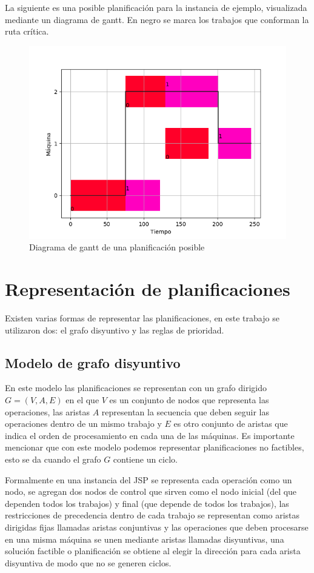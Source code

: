 La siguiente es una posible planificación para la instancia de ejemplo, visualizada mediante un diagrama de gantt. En negro se marca los trabajos que conforman la ruta crítica. 
\begin{figure}[H]
\centering
\includegraphics[scale=.7]{Imagenes/planejemplorc.png}
\caption{Diagrama de gantt de una planificación posible}
\label{fig:gantt}
\end{figure}


\section{Representación de planificaciones}
Existen varias formas de representar las planificaciones, en este trabajo se utilizaron dos: el grafo disyuntivo y las reglas de prioridad.
\subsection*{Modelo de grafo disyuntivo} 
En este modelo las planificaciones se representan con un grafo dirigido $G=(V,A,E)$ en el que $V$ es un conjunto de nodos que representa las operaciones, las aristas $A$ representan la secuencia que deben seguir las operaciones dentro de un mismo trabajo y $E$ es otro conjunto de aristas que indica el orden de procesamiento en cada una de las máquinas. Es importante mencionar que con este modelo podemos representar planificaciones no factibles, esto se da cuando el grafo $G$ contiene un ciclo.


Formalmente en una instancia del JSP se representa cada operación como un nodo, se agregan dos nodos de control que sirven como el nodo inicial (del que dependen todos los trabajos) y final (que depende de todos los trabajos), las restricciones de precedencia dentro de cada trabajo se representan como aristas dirigidas fijas llamadas aristas conjuntivas y las operaciones que deben procesarse en una misma máquina se unen mediante aristas llamadas disyuntivas, una solución factible o planificación se obtiene al elegir la dirección para cada arista disyuntiva de modo que no se generen ciclos.   

